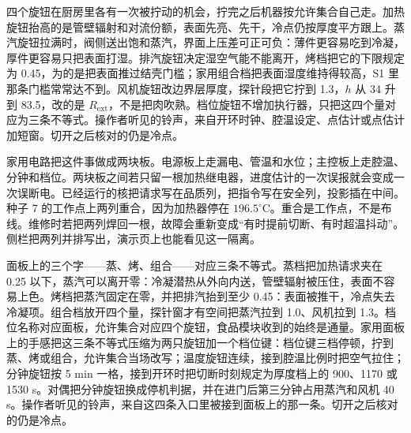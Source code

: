 四个旋钮在厨房里各有一次被拧动的机会，拧完之后机器按允许集合自己走。加热旋钮抬高的是管壁辐射和对流份额，表面先亮、先干，冷点仍按厚度平方跟上。蒸汽旋钮拉满时，阀侧送出饱和蒸汽，界面上压差可正可负：薄件更容易吃到冷凝，厚件更容易只把表面打湿。排汽旋钮决定湿空气能不能离开，烤档把它的下限规定为 0.45，为的是把表面推过结壳门槛；家用组合档把表面湿度维持得较高，S1 里那条门槛常常达不到。风机旋钮改边界层厚度，探针段把它拧到 1.3，\(h\) 从 34 升到 83.5，改的是 \(R_{\mathrm{ext}}\)，不是把肉吹熟。档位旋钮不增加执行器，只把这四个量对应为三条不等式。操作者听见的铃声，来自开环时钟、腔温设定、点估计或点估计加短窗。切开之后核对的仍是冷点。

家用电路把这件事做成两块板。电源板上走漏电、管温和水位；主控板上走腔温、分钟和档位。两块板之间若只留一根加热继电器，进度估计的一次误报就会变成一次误断电。已经运行的核把请求写在品质列，把指令写在安全列，投影插在中间。种子 7 的工作点上两列重合，因为加热器停在 \(196.5^\circ\mathrm{C}\)。重合是工作点，不是布线。维修时若把两列焊回一根，故障会重新变成“有时提前切断、有时超温抖动”。侧栏把两列并排写出，演示页上也能看见这一隔离。

面板上的三个字——蒸、烤、组合——对应三条不等式。蒸档把加热请求夹在 0.25 以下，蒸汽可以离开零：冷凝潜热从外向内送，管壁辐射被压住，表面不容易上色。烤档把蒸汽固定在零，并把排汽抬到至少 0.45：表面被推干，冷点失去冷凝项。组合档放开四个量，探针窗才有空间把蒸汽拉到 1.0、风机拉到 1.3。档位名称对应面板，允许集合对应四个旋钮，食品模块收到的始终是通量。家用面板上的手感把这三条不等式压缩为两只旋钮加一个档位键：档位键三档停顿，拧到蒸、烤或组合，允许集合当场改写；温度旋钮连续，接到腔温比例时把空气拉住；分钟旋钮按 5 min 一格，接到开环时把切断时刻规定为厚度档上的 900、1170 或 1530 s。对偶把分钟旋钮换成停机判据，并在进门后第三分钟占用蒸汽和风机 40 s。操作者听见的铃声，来自这四条入口里被接到面板上的那一条。切开之后核对的仍是冷点。
